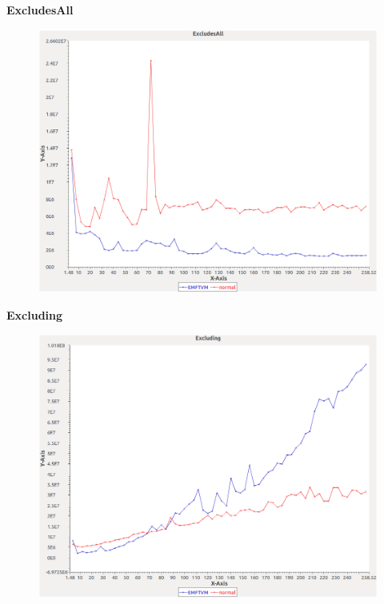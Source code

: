 \noindent\textbf{ExcludesAll}

\begin{figure}[h]
\centering
\includegraphics[width=\textwidth]{graphs/set/ExcludesAll}
\end{figure}
\pagebreak

\noindent\textbf{Excluding}

\begin{figure}[h]
\centering
\includegraphics[width=\textwidth]{graphs/set/Excluding}
\end{figure}
\pagebreak

